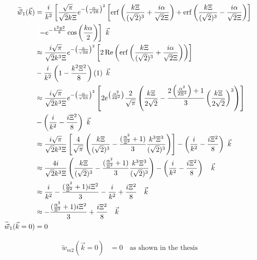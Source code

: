 \documentclass[double,12pt]{beavtex}
\begin{document}
\begin{align}
   \widetilde{\vec{w}}_1(\vec{k}) &= \frac{i}{k^2}\left[\frac{\sqrt{\pi}}
   {\sqrt{2}k\Xi}
   e^{-\left(\frac{\alpha}{\sqrt{2}\Xi}\right)^2}\left[\operatorname{erf}
   \left(\frac{k\Xi}{(\sqrt{2})^3}+\frac{i\alpha}{\sqrt{2}\Xi}\right)
   +\operatorname{erf}\left(\frac{k\Xi}{(\sqrt{2})^3}-\frac{i\alpha}
   {\sqrt{2}\Xi}
   \right)\right]\color{white}\right]\color{black}  \nonumber \\
 & \color{white}\left[\color{black}-e^{-\frac{k^2\Xi^2}{8}}\cos\left(
    \frac{k\alpha}{2}\right)\right]{~}\color{black}\vec{k} \\
    & \approx  \frac{i\sqrt{\pi}}{\sqrt{2}k^3\Xi}e^{-\left(\frac{\alpha}
    {\sqrt{2}\Xi}\right)^2}\left[2\operatorname{Re}\left(\operatorname{erf}
    \left(\frac{k\Xi}{(\sqrt{2})^3}+\frac{i\alpha}{\sqrt{2}\Xi}\right)
    \right)\right] \nonumber \\
    &-\frac{i}{k^2}\left(1-\frac{k^2\Xi^2}{8}\right)\left(1\right) 
    {~}\vec{k} \\
    & \approx  \frac{i\sqrt{\pi}}{\sqrt{2}k^3\Xi}e^{-\left(\frac{\alpha}
    {\sqrt{2}\Xi}\right)^2}\left[2e^{\left(\frac{\alpha^2}{2\Xi^2}\right)}
    \frac{2}{\sqrt{\pi}}   \left(\frac{k\Xi}{2\sqrt{2}}   -\frac{2\left(
    \frac{\alpha^2}{2\Xi^2}\right)+1}{3}\left(\frac{k\Xi}{2\sqrt{2}}
    \right)^3\right)\right] \nonumber \\
    &-\left(\frac{i}{k^2}-\frac{i\Xi^2}{8}\right) {~}\vec{k}\\
    & \approx  \frac{i\sqrt{\pi}}{\sqrt{2}k^3\Xi}\left[\frac{4}{\sqrt{\pi}}
    \left(\frac{k\Xi}{(\sqrt{2})^3} -\frac{(\frac{\alpha^2}{\Xi^2}+1)}{3}
    \frac{k^3\Xi^3}{(\sqrt{2})^3}\right)\right] -\left(\frac{i}{k^2}
    -\frac{i\Xi^2}{8}\right) {~}\vec{k}\\
    & \approx  \frac{4i}{\sqrt{2}k^3\Xi}\left(\frac{k\Xi}{(\sqrt{2})^3} 
    -\frac{(\frac{\alpha^2}{\Xi^2}+1)}{3}\frac{k^3\Xi^3}{(\sqrt{2})^3}
    \right)-\left(\frac{i}{k^2}-\frac{i\Xi^2}{8}\right) {~~~}\vec{k}\\
    & \approx  \frac{i}{k^2} -\frac{(\frac{\alpha^2}{\Xi^2}+1)i\Xi^2}{3}
    -\frac{i}{k^2}+\frac{i\Xi^2}{8} {~~~}\vec{k}\\
    & \approx  -\frac{(\frac{\alpha^2}{\Xi^2}+1)i\Xi^2}{3}
    +\frac{i\Xi^2}{8} {~~~}\vec{k}\\
     \widetilde{\vec w}_1(\vec k=0) &= 0 
\end{align}

\begin{align}
   \overleftrightarrow{w}_{m2}(\vec k=0) &= 0  \mbox{~~~as shown in the thesis}
\end{align}
\end{document}
